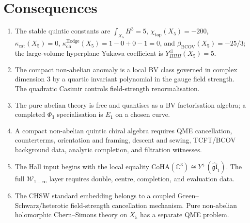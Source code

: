 \documentclass[11pt]{amsart}
\providecommand{\kchHodge}{\kappa_{\mathrm{ch}}^{\mathrm{Hodge}}}
\providecommand{\kcat}{\kappa_{\mathrm{cat}}}
\providecommand{\bBCOV}{\beta_{\mathrm{BCOV}}}
\providecommand{\CoHA}{\mathrm{CoHA}}
\begin{document}
\section*{Consequences}
\label{sec:hcs-quintic-conclusions}

\begin{enumerate}
\item The stable quintic constants are
$\int_{X_5}H^3=5$, $\chi_{\mathrm{top}}(X_5)=-200$,
$\kcat(X_5)=0$, $\kchHodge(X_5)=1-0+0-1=0$, and
$\bBCOV(X_5)=-25/3$; the large-volume hyperplane Yukawa coefficient is
$Y_{HHH}^{\mathrm{cl}}(X_5)=5$.
\item The compact non-abelian anomaly is a local BV class governed in
complex dimension $3$ by a quartic invariant polynomial in the gauge
field strength. The quadratic Casimir controls field-strength
renormalisation.
\item The pure abelian theory is free and quantises as a BV
factorisation algebra; a completed $\Phi_3$ specialisation is $E_1$ on
a chosen curve.
\item A compact non-abelian quintic chiral algebra requires QME
cancellation, counterterms, orientation and framing, descent and
sewing, TCFT/BCOV background data, analytic completion, and filtration
witnesses.
\item The Hall input begins with the local equality
$\CoHA(\mathbb C^3)\cong Y^+(\widehat{\mathfrak{gl}}_1)$. The full
$\mathcal W_{1+\infty}$ layer requires double, centre, completion, and
evaluation data.
\item The CHSW standard embedding belongs to a coupled
Green--Schwarz/heterotic field-strength cancellation mechanism. Pure
non-abelian holomorphic Chern--Simons theory on $X_5$ has a separate
QME problem.
\end{enumerate}
\end{document}
